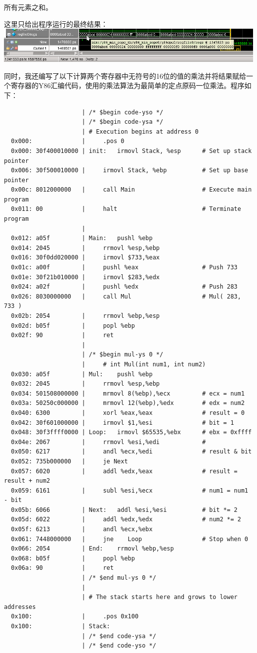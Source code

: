 所有元素之和。

这里只给出程序运行的最终结果： \includegraphics{img/sim0.png}

同时，我还编写了以下计算两个寄存器中无符号的16位的值的乘法并将结果赋给一个寄存器的Y86汇编代码，使用的乘法算法为最简单的定点原码一位乘法。程序如下：

\begin{verbatim}
                      | /* $begin code-yso */
                      | /* $begin code-ysa */
                      | # Execution begins at address 0
  0x000:              |     .pos 0
  0x000: 30f400010000 | init:   irmovl Stack, %esp      # Set up stack pointer
  0x006: 30f500010000 |     irmovl Stack, %ebp          # Set up base pointer
  0x00c: 8012000000   |     call Main                   # Execute main program
  0x011: 00           |     halt                        # Terminate program
                      | 
  0x012: a05f         | Main:   pushl %ebp
  0x014: 2045         |     rrmovl %esp,%ebp
  0x016: 30f0dd020000 |     irmovl $733,%eax
  0x01c: a00f         |     pushl %eax                  # Push 733
  0x01e: 30f21b010000 |     irmovl $283,%edx
  0x024: a02f         |     pushl %edx                  # Push 283
  0x026: 8030000000   |     call Mul                    # Mul( 283, 733 )
  0x02b: 2054         |     rrmovl %ebp,%esp
  0x02d: b05f         |     popl %ebp
  0x02f: 90           |     ret
                      | 
                      | /* $begin mul-ys 0 */
                      |     # int Mul(int num1, int num2)
  0x030: a05f         | Mul:    pushl %ebp
  0x032: 2045         |     rrmovl %esp,%ebp
  0x034: 501508000000 |     mrmovl 8(%ebp),%ecx         # ecx = num1
  0x03a: 50250c000000 |     mrmovl 12(%ebp),%edx        # edx = num2
  0x040: 6300         |     xorl %eax,%eax              # result = 0
  0x042: 30f601000000 |     irmovl $1,%esi              # bit = 1
  0x048: 30f3ffff0000 | Loop:   irmovl $65535,%ebx      # ebx = 0xffff
  0x04e: 2067         |     rrmovl %esi,%edi            #
  0x050: 6217         |     andl %ecx,%edi              # result & bit
  0x052: 735b000000   |     je Next
  0x057: 6020         |     addl %edx,%eax              # result = result + num2
  0x059: 6161         |     subl %esi,%ecx              # num1 = num1 - bit
  0x05b: 6066         | Next:   addl %esi,%esi          # bit *= 2
  0x05d: 6022         |     addl %edx,%edx              # num2 *= 2
  0x05f: 6213         |     andl %ecx,%ebx
  0x061: 7448000000   |     jne    Loop                 # Stop when 0
  0x066: 2054         | End:    rrmovl %ebp,%esp
  0x068: b05f         |     popl %ebp
  0x06a: 90           |     ret
                      | /* $end mul-ys 0 */
                      | 
                      | # The stack starts here and grows to lower addresses
  0x100:              |     .pos 0x100
  0x100:              | Stack:
                      | /* $end code-ysa */
                      | /* $end code-yso */
\end{verbatim}

